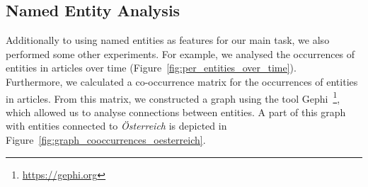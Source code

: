\documentclass[acmsmall]{acmart}
\begin{document}
\subsection{Named Entity Analysis}
Additionally to using named entities as features for our main task, we also performed some other experiments. For example, we analysed the occurrences of entities in articles over time (Figure~\ref{fig:per_entities_over_time}). \\ Furthermore, we calculated a co-occurrence matrix for the occurrences of entities in articles. From this matrix, we constructed a graph using the tool Gephi~\footnote{\url{https://gephi.org}}, which allowed us to analyse connections between entities. A part of this graph with entities connected to \textit{\"Osterreich} is depicted in Figure~\ref{fig:graph_cooccurrences_oesterreich}.
\end{document}
